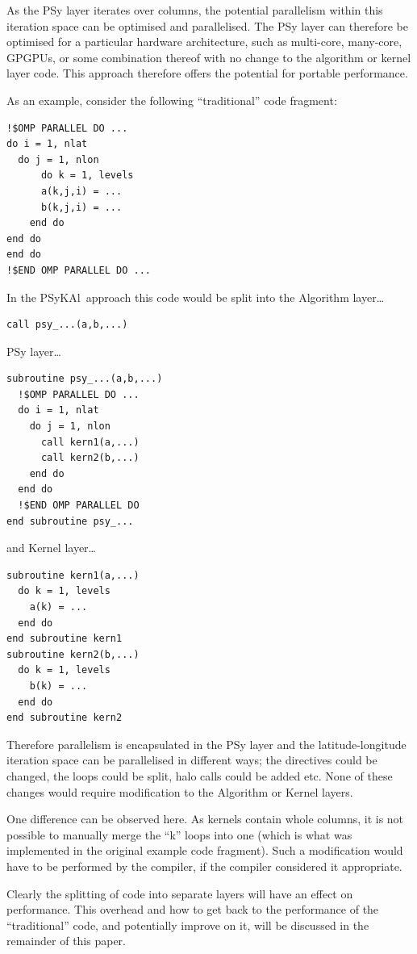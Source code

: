\documentclass{IOS-Book-Article}
\newcommand{\psykal}{{PS}y{KA}l\ }
\begin{document}
As the PSy layer iterates over columns, the potential parallelism
within this iteration space can be optimised and parallelised. The PSy
layer can therefore be optimised for a particular hardware
architecture, such as multi-core, many-core, GPGPUs, or some
combination thereof with no change to the algorithm or kernel layer
code. This approach therefore offers the potential for portable
performance.

As an example, consider the following ``traditional'' code fragment:
\begin{verbatim}
!$OMP PARALLEL DO ...
do i = 1, nlat
  do j = 1, nlon
      do k = 1, levels
      a(k,j,i) = ...
      b(k,j,i) = ...
    end do
end do
end do
!$END OMP PARALLEL DO ...
\end{verbatim}
In the \psykal approach this code would be split into the {A}lgorithm
layer\ldots
\begin{verbatim}
call psy_...(a,b,...)
\end{verbatim}
PSy layer\ldots
\begin{verbatim}
subroutine psy_...(a,b,...)
  !$OMP PARALLEL DO ...
  do i = 1, nlat
    do j = 1, nlon
      call kern1(a,...)
      call kern2(b,...)
    end do
  end do
  !$END OMP PARALLEL DO
end subroutine psy_...
\end{verbatim}
and {K}ernel layer\ldots
\begin{verbatim}
subroutine kern1(a,...)
  do k = 1, levels
    a(k) = ...
  end do
end subroutine kern1
subroutine kern2(b,...)
  do k = 1, levels
    b(k) = ...
  end do
end subroutine kern2
\end{verbatim}

Therefore parallelism is encapsulated in the PSy layer and the
latitude-longitude iteration space can be parallelised in different
ways; the directives could be changed, the loops could be split, halo
calls could be added etc. None of these changes would require
modification to the Algorithm or Kernel layers.

One difference can be observed here. As kernels contain whole columns,
it is not possible to manually merge the ``k'' loops into one (which is
what was implemented in the original example code fragment). Such a
modification would have to be performed by the compiler, if the
compiler considered it appropriate.

Clearly the splitting of code into separate layers will have an effect
on performance. This overhead and how to get back to the performance
of the ``traditional'' code, and potentially improve on it, will be
discussed in the remainder of this paper.
\end{document}
